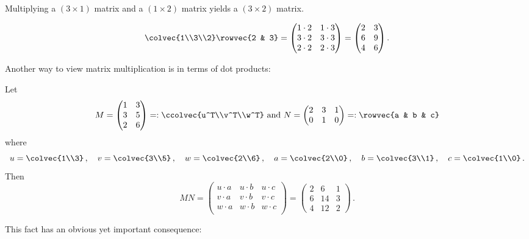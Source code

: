 

\begin{example}
Multiplying a $(3\times 1)$ matrix and a $(1\times 2)$ matrix yields a $(3\times 2)$ matrix.

\[
\colvec{1\\3\\2} \rowvec{2 & 3} = 
\begin{pmatrix}
1\cdot 2 & 1\cdot 3 \\
3\cdot 2 & 3\cdot 3 \\
2\cdot 2 & 2\cdot 3 \\
\end{pmatrix}
= \begin{pmatrix}
2 & 3 \\
6 & 9 \\
4 & 6 
\end{pmatrix} .
\]
\end{example}

Another way to view matrix multiplication is in terms of dot products:

\begin{center}
\end{center}


\begin{example}
Let \[M=\begin{pmatrix}1&3\\3&5\\2&6\end{pmatrix}=:\ccolvec{u^T\\v^T\\w^T}
\mbox{ and }
N=\begin{pmatrix}2&3&1\\0&1&0\end{pmatrix}=:\rowvec{a & b & c}\]
where
\[
u=\colvec{1\\3}\, ,\quad
v=\colvec{3\\5}\, ,\quad 
w=\colvec{2\\6}\, ,\quad
a=\colvec{2\\0}\, ,\quad
b=\colvec{3\\1}\, ,\quad 
c=\colvec{1\\0}\, .
\]
Then 
\[
MN=\left(\!\begin{array}{ccc}
u\cdot a & u\cdot b & u\cdot c\\
v\cdot a & v\cdot b & v\cdot c\\
w\cdot a & w\cdot b & w\cdot c\\ 
\end{array}\!\right)
=
\begin{pmatrix}
2&6&1\\
6&14&3\\
4&12&2
\end{pmatrix}\, .
\]
\end{example}
This fact has an obvious yet important consequence:

